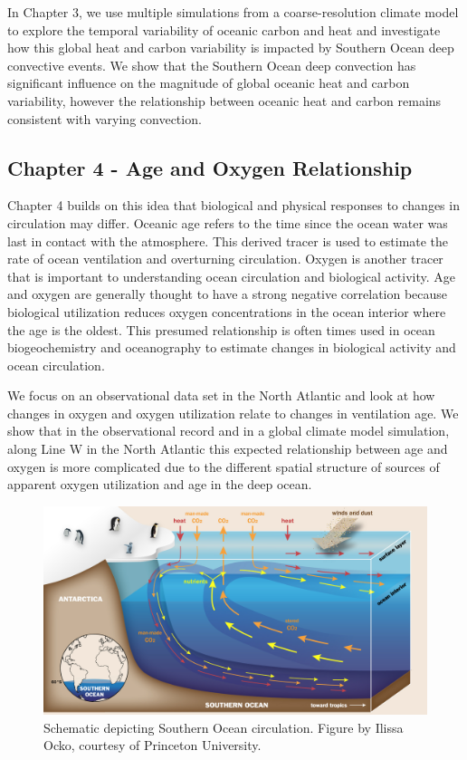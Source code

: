 In Chapter 3, we use multiple simulations from a coarse-resolution climate model to explore the temporal variability of oceanic carbon and heat and investigate how this global heat and carbon variability is impacted by Southern Ocean deep convective events. We show that the Southern Ocean deep convection has significant influence on the magnitude of global oceanic heat and carbon variability, however the relationship between oceanic heat and carbon remains consistent with varying convection.

\subsection{Chapter 4 - Age and Oxygen Relationship}
Chapter 4 builds on this idea that biological and physical responses to changes in circulation may differ. Oceanic age refers to the time since the ocean water was last in contact with the atmosphere. This derived tracer is used to estimate the rate of ocean ventilation and overturning circulation. Oxygen is another tracer that is important to understanding ocean circulation and biological activity. Age and oxygen are generally thought to have a strong negative correlation because biological utilization reduces oxygen concentrations in the ocean interior where the age is the oldest. This presumed relationship is often times used in ocean biogeochemistry and oceanography to estimate changes in biological activity and ocean circulation.

We focus on an observational data set in the North Atlantic and look at how changes in oxygen and oxygen utilization relate to changes in ventilation age. We show that in the observational record and in a global climate model simulation, along Line W in the North Atlantic this expected relationship between age and oxygen is more complicated due to the different spatial structure of sources of apparent oxygen utilization and age in the deep ocean.


\begin{figure}
\centering
\includegraphics[width=33pc]{Southern_Ocean.jpg}
\caption{Schematic depicting Southern Ocean circulation. Figure by Ilissa Ocko, courtesy of Princeton University.}
\label{fig:carbon_cycle}
\end{figure}


